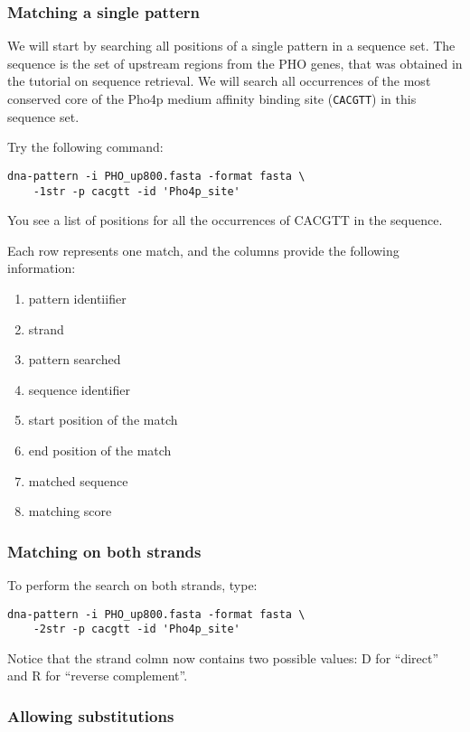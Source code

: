 \subsubsection{Matching a single pattern}

We will start by searching all positions of a single pattern in a
sequence set. The sequence is the set of upstream regions from the PHO
genes, that was obtained in the tutorial on sequence retrieval. We
will search all occurrences of the most conserved core of the Pho4p
medium affinity binding site (\texttt{CACGTT}) in this sequence set.

Try the following command:

\begin{verbatim}
dna-pattern -i PHO_up800.fasta -format fasta \ 
    -1str -p cacgtt -id 'Pho4p_site'
\end{verbatim}

You see a list of positions for all the occurrences of CACGTT in the sequence.

Each row represents one match, and the columns provide the following
information:
\begin{enumerate}
\item pattern identiifier
\item strand
\item pattern searched
\item sequence identifier
\item start position of the match
\item end position of the match
\item matched sequence
\item matching score
\end{enumerate}

\subsubsection{Matching on both strands}

To perform the search on both strands, type:
\begin{verbatim}
dna-pattern -i PHO_up800.fasta -format fasta \ 
    -2str -p cacgtt -id 'Pho4p_site'
\end{verbatim}

Notice that the strand colmn now contains two possible values: D for
``direct'' and R for ``reverse complement''.

\subsubsection{Allowing substitutions}

